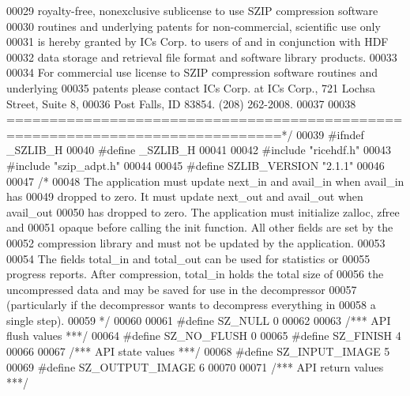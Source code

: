 \begin{DoxyCode}
00029 \textcolor{comment}{royalty-free, nonexclusive sublicense to use SZIP compression software}
00030 \textcolor{comment}{routines and underlying patents for non-commercial, scientific use only}
00031 \textcolor{comment}{is hereby granted by ICs Corp. to users of and in conjunction with HDF}
00032 \textcolor{comment}{data storage and retrieval file format and software library products.}
00033 \textcolor{comment}{}
00034 \textcolor{comment}{For commercial use license to SZIP compression software routines and underlying}
00035 \textcolor{comment}{patents please contact ICs Corp. at ICs Corp., 721 Lochsa Street, Suite 8,}
00036 \textcolor{comment}{Post Falls, ID 83854.  (208) 262-2008.}
00037 \textcolor{comment}{}
00038 \textcolor{comment}{==============================================================================*/}
00039 \textcolor{preprocessor}{#ifndef \_SZLIB\_H}
00040 \textcolor{preprocessor}{#define \_SZLIB\_H}
00041 
00042 \textcolor{preprocessor}{#include "ricehdf.h"}
00043 \textcolor{preprocessor}{#include "szip\_adpt.h"}
00044 
00045 \textcolor{preprocessor}{#define SZLIB\_VERSION "2.1.1"}
00046 
00047 \textcolor{comment}{/*}
00048 \textcolor{comment}{   The application must update next\_in and avail\_in when avail\_in has}
00049 \textcolor{comment}{   dropped to zero. It must update next\_out and avail\_out when avail\_out}
00050 \textcolor{comment}{   has dropped to zero. The application must initialize zalloc, zfree and}
00051 \textcolor{comment}{   opaque before calling the init function. All other fields are set by the}
00052 \textcolor{comment}{   compression library and must not be updated by the application.}
00053 \textcolor{comment}{}
00054 \textcolor{comment}{   The fields total\_in and total\_out can be used for statistics or}
00055 \textcolor{comment}{   progress reports. After compression, total\_in holds the total size of}
00056 \textcolor{comment}{   the uncompressed data and may be saved for use in the decompressor}
00057 \textcolor{comment}{   (particularly if the decompressor wants to decompress everything in}
00058 \textcolor{comment}{   a single step).}
00059 \textcolor{comment}{*/}
00060 
00061 \textcolor{preprocessor}{#define SZ\_NULL  0}
00062 
00063 \textcolor{comment}{/*** API flush values ***/}
00064 \textcolor{preprocessor}{#define SZ\_NO\_FLUSH      0}
00065 \textcolor{preprocessor}{#define SZ\_FINISH        4}
00066 
00067 \textcolor{comment}{/*** API state values ***/}
00068 \textcolor{preprocessor}{#define SZ\_INPUT\_IMAGE   5}
00069 \textcolor{preprocessor}{#define SZ\_OUTPUT\_IMAGE  6}
00070 
00071 \textcolor{comment}{/*** API return values ***/}

\end{DoxyCode}
